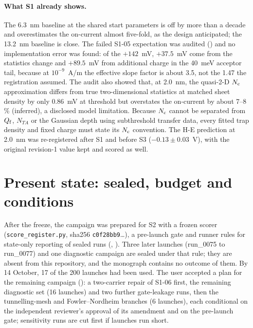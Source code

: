 \paragraph{What S1 already shows.} The 6.3~nm baseline at the shared start parameters is off by more than a decade
and overestimates the on-current almost five-fold, as the design anticipated; the 13.2~nm baseline is close. The failed
S1-05 expectation was audited () and no implementation error was found: of the $+142$~mV, $+37.5$~mV come from
the statistics change and $+89.5$~mV from additional charge in the 40~meV acceptor tail, because at $10^{-9}$~A/\textmu m
the effective slope factor is about 3.5, not the 1.47 the registration assumed. The audit also showed that, at
2.0~nm, the quasi-2-D $N_{\mathrm{c}}$ approximation differs from true two-dimensional statistics at matched sheet density by only
0.86~mV at threshold but overstates the on-current by about 7--8\,\% (inferred), a disclosed model limitation. Because
$N_{\mathrm{c}}$ cannot be separated from $Q_{\mathrm{f}}$, $N_{TA}$ or the Gaussian depth using subthreshold transfer data, every fitted trap
density and fixed charge must state its $N_{\mathrm{c}}$ convention. The H-E prediction at 2.0~nm was re-registered after S1 and
before S3 ($-0.13\pm0.03$~V), with the original revision-1 value kept and scored as well.

\section{Present state: sealed, budget and conditions}
\label{sec:mono-c10-state}

After the freeze, the campaign was prepared for S2 with a frozen scorer (\texttt{score\_register.py},
sha256 \texttt{c0f28bb9}\ldots), a pre-launch gate and runner rules for state-only reporting of sealed runs
(, ). Three later launches (run\_0075 to run\_0077) and one diagnostic campaign are sealed under
that rule; they are absent from this repository, and the monograph contains no outcome of them. By 14 October, 17 of the
200 launches had been used. The user accepted a plan for the remaining campaign (): a two-carrier repair of
S1-06 first, the remaining diagnostic set (16 launches) and two further gate-leakage runs, then the tunnelling-mesh and
Fowler--Nordheim branches (6 launches), each conditional on the independent reviewer's approval of its amendment and on
the pre-launch gate; sensitivity runs are cut first if launches run short.

